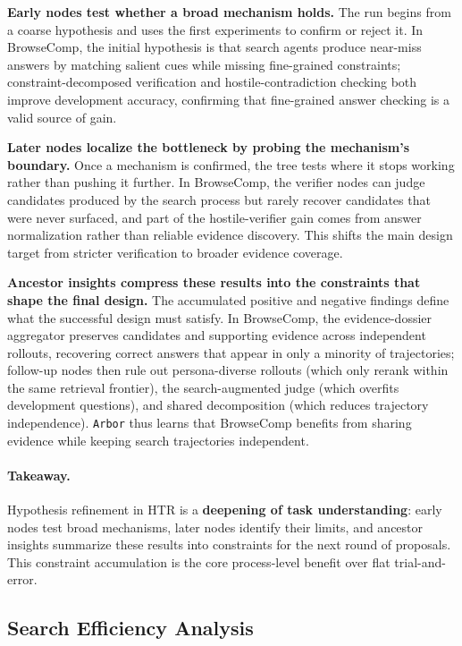 \documentclass{llmxive}
\providecommand{\arbor}{\texttt{Arbor}}
\begin{document}
\textbf{Early nodes test whether a broad mechanism holds.}
The run begins from a coarse hypothesis and uses the first experiments to confirm or reject it. In BrowseComp, the initial hypothesis is that search agents produce near-miss answers by matching salient cues while missing fine-grained constraints; constraint-decomposed verification and hostile-contradiction checking both improve development accuracy, confirming that fine-grained answer checking is a valid source of gain.
 
\textbf{Later nodes localize the bottleneck by probing the mechanism's boundary.}
Once a mechanism is confirmed, the tree tests where it stops working rather than pushing it further. In BrowseComp, the verifier nodes can judge candidates produced by the search process but rarely recover candidates that were never surfaced, and part of the hostile-verifier gain comes from answer normalization rather than reliable evidence discovery. This shifts the main design target from stricter verification to broader evidence coverage.
 
\textbf{Ancestor insights compress these results into the constraints that shape the final design.}
The accumulated positive and negative findings define what the successful design must satisfy. In BrowseComp, the evidence-dossier aggregator preserves candidates and supporting evidence across independent rollouts, recovering correct answers that appear in only a minority of trajectories; follow-up nodes then rule out persona-diverse rollouts (which only rerank within the same retrieval frontier), the search-augmented judge (which overfits development questions), and shared decomposition (which reduces trajectory independence). \arbor{} thus learns that BrowseComp benefits from sharing evidence while keeping search trajectories independent.
 
\paragraph{Takeaway.}
Hypothesis refinement in HTR is a \textbf{deepening of task understanding}: early nodes test broad mechanisms, later nodes identify their limits, and ancestor insights summarize these results into constraints for the next round of proposals. This constraint accumulation is the core process-level benefit over flat trial-and-error.
 
\subsection{Search Efficiency Analysis}
\label{sec:discussion-timing}
 
\end{document}
